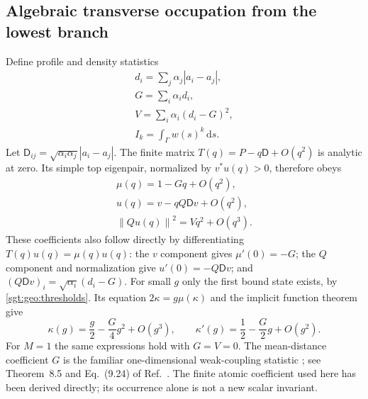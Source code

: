 \documentclass[aps,pra,reprint,superscriptaddress,longbibliography]{revtex4-2}
\newcommand{\dd}{\mathrm d}
\newcommand{\norm}[1]{\left\lVert#1\right\rVert}
\begin{document}
\subsection{Algebraic transverse occupation from the lowest branch}
\label{sgt:geo:rotation}

Define profile and density statistics
\begin{equation}
\begin{gathered}
 d_i=\sum_j\alpha_j|a_i-a_j|,\\
 G=\sum_i\alpha_i d_i,\\
 V=\sum_i\alpha_i(d_i-G)^2,\\
 I_k=\int_\Gamma w(s)^k\,\dd s.
 \label{sgt:geo:profile-statistics}
\end{gathered}
\end{equation}
Let $\mathsf D_{ij}=\sqrt{\alpha_i\alpha_j}|a_i-a_j|$.
The finite matrix $T(q)=P-q\mathsf D+O(q^2)$ is analytic at zero.
Its simple top eigenpair, normalized by $v^*u(q)>0$, therefore obeys
\begin{equation}
\begin{gathered}
 \mu(q)=1-Gq+O(q^2),\\
 u(q)=v-qQ\mathsf Dv+O(q^2),\\
 \norm{Qu(q)}^2=Vq^2+O(q^3).
 \label{sgt:geo:eigenvector-rotation}
\end{gathered}
\end{equation}
These coefficients also follow directly by differentiating
$T(q)u(q)=\mu(q)u(q)$: the $v$ component gives $\mu'(0)=-G$;
the $Q$ component and normalization give $u'(0)=-Q\mathsf Dv$;
and $(Q\mathsf Dv)_i=\sqrt{\alpha_i}(d_i-G)$.
For small $g$ only the first bound state exists, by
\eqref{sgt:geo:thresholds}.  Its equation $2\kappa=g\mu(\kappa)$
and the implicit function theorem give
\begin{equation}
 \kappa(g)=\frac g2-\frac G4g^2+O(g^3),\qquad
 \kappa'(g)=\frac12-\frac G2g+O(g^2).
 \label{sgt:geo:weak-coupling}
\end{equation}
For $M=1$ the same expressions hold with $G=V=0$.
The mean-distance coefficient $G$ is the familiar one-dimensional
weak-coupling statistic \cite{Simon1976,Simon2022}; see
Theorem~8.5 and Eq.~(9.24) of Ref.~\cite{Simon2022}.
The finite atomic coefficient used here has been derived directly;
its occurrence alone is not a new scalar invariant.
\end{document}
